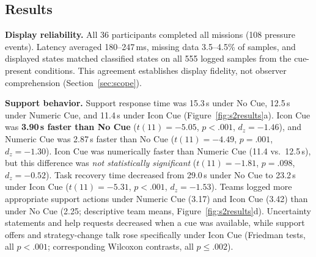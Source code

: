 \documentclass[sigconf]{acmart}
\begin{document}
\subsection{Results}
\textbf{Display reliability.} All 36 participants completed all missions (108 pressure events). Latency averaged 180--247\,ms, missing data 3.5--4.5\% of samples, and displayed states matched classified states on all 555 logged samples from the cue-present conditions. This agreement establishes display fidelity, not observer comprehension (Section~\ref{sec:scope}).

\textbf{Support behavior.} Support response time was 15.3\,s under No Cue, 12.5\,s under Numeric Cue, and 11.4\,s under Icon Cue (Figure~\ref{fig:s2results}a). Icon Cue was \textbf{3.90\,s faster than No Cue} ($t(11)=-5.05$, $p<.001$, $d_z=-1.46$), and Numeric Cue was 2.87\,s faster than No Cue ($t(11)=-4.49$, $p=.001$, $d_z=-1.30$). Icon Cue was numerically faster than Numeric Cue (11.4 vs.\ 12.5\,s), but this difference was \emph{not statistically significant} ($t(11)=-1.81$, $p=.098$, $d_z=-0.52$). Task recovery time decreased from 29.0\,s under No Cue to 23.2\,s under Icon Cue ($t(11)=-5.31$, $p<.001$, $d_z=-1.53$). Teams logged more appropriate support actions under Numeric Cue (3.17) and Icon Cue (3.42) than under No Cue (2.25; descriptive team means, Figure~\ref{fig:s2results}d). Uncertainty statements and help requests decreased when a cue was available, while support offers and strategy-change talk rose specifically under Icon Cue (Friedman tests, all $p<.001$; corresponding Wilcoxon contrasts, all $p\leq.002$).
\end{document}
